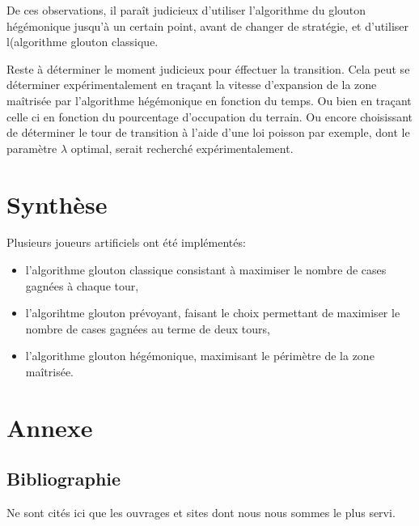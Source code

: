 \documentclass[12pt,a4paper,twoside]{article}
\begin{document}
De ces observations, il paraît judicieux d'utiliser l'algorithme du
glouton hégémonique jusqu'à un certain point, avant de changer de
stratégie, et d'utiliser l(algorithme glouton classique.

Reste à déterminer le moment judicieux pour éffectuer la
transition. Cela peut se déterminer expérimentalement en traçant la
vitesse d'expansion de la zone maîtrisée par l'algorithme hégémonique
en fonction du temps. Ou bien en traçant celle ci en fonction du
pourcentage d'occupation du terrain. Ou encore choisissant de
déterminer le tour de transition à l'aide d'une loi poisson par
exemple, dont le paramètre \(\lambda\) optimal, serait recherché
expérimentalement.
 
\section{Synthèse}
\label{sec:orgheadline26}
\label{sec:conclusion}
Plusieurs joueurs artificiels ont été implémentés: 
\begin{itemize}
\item l'algorithme glouton classique consistant à maximiser le nombre
  de cases gagnées à chaque tour,
\item l'algorihtme glouton prévoyant, faisant le choix permettant de
  maximiser le nombre de cases gagnées au terme de deux tours,
\item l'algorithme glouton hégémonique, maximisant le périmètre de la
  zone maîtrisée.
\end{itemize}


\clearpage\appendix

\section{Annexe}
\label{sec:orgheadline28}
\subsection{Bibliographie}
\label{sec:orgheadline27}
Ne sont cités ici que les ouvrages et sites dont nous nous sommes le plus
servi.

\def\section*#1{}

\nocite{*}

\clearpage
\end{document}
